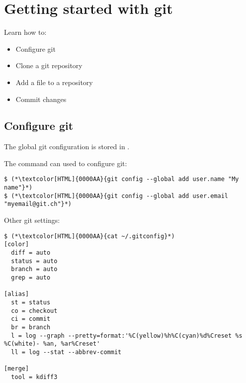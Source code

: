 \section{Getting started with git}
\begin{frame}[fragile]
  \slidetitle

  Learn how to:
  \begin{itemize}
    \item Configure git
    \item Clone a git repository
    \item Add a file to a repository
    \item Commit changes
  \end{itemize}
\end{frame}

\subsection{Configure git}
\begin{frame}[fragile]
  \subslidetitle
  The global git configuration is stored in .
  \\
  \vspace{1em}

  The command  can used to configure git:
  \begin{lstlisting}
$ (*\textcolor[HTML]{0000AA}{git config --global add user.name "My name"}*)
$ (*\textcolor[HTML]{0000AA}{git config --global add user.email "myemail@git.ch"}*)
  \end{lstlisting}

  Other git settings:
  \begin{lstlisting}[basicstyle=\small\ttfamily\bfseries]
$ (*\textcolor[HTML]{0000AA}{cat ~/.gitconfig}*)
[color]
  diff = auto
  status = auto
  branch = auto
  grep = auto

[alias]
  st = status
  co = checkout
  ci = commit
  br = branch
  l = log --graph --pretty=format:'%C(yellow)%h%C(cyan)%d%Creset %s %C(white)- %an, %ar%Creset'
  ll = log --stat --abbrev-commit

[merge]
  tool = kdiff3
  \end{lstlisting}

\end{frame}

